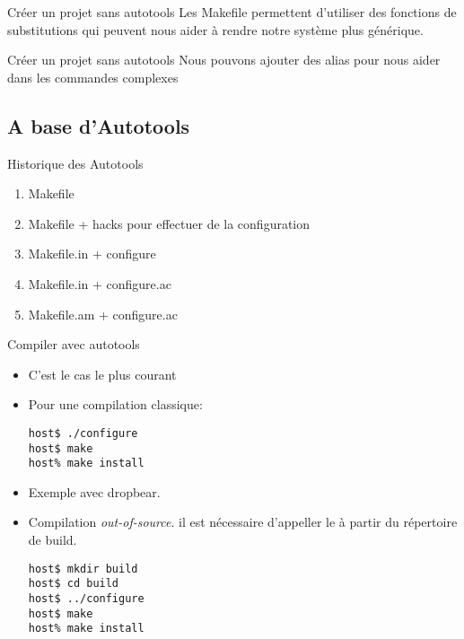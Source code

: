 \begin{frame}[fragile=singleslide]{Créer un projet sans autotools}
  Les  Makefile permettent d'utiliser  des fonctions  de substitutions
  qui  peuvent  nous aider  à  rendre  notre  système plus  générique.
  
\end{frame}

\begin{frame}[fragile=singleslide]{Créer un projet sans autotools}
  Nous pouvons  ajouter des alias  pour nous aider dans  les commandes
  complexes
  
\end{frame}

\subsection{A base d'Autotools}

\begin{frame}[fragile=singleslide]{Historique des Autotools}
  \begin{enumerate}
  \item Makefile
  \item Makefile + hacks pour effectuer de la configuration
  \item Makefile.in + configure
  \item Makefile.in + configure.ac
  \item Makefile.am + configure.ac
  \end{enumerate}
\end{frame}

\begin{frame}[fragile=singleslide]{Compiler avec autotools}
  \begin{itemize}
  \item C'est le cas le plus courant
  \item Pour une compilation classique:
\begin{lstlisting}
host$ ./configure
host$ make
host% make install
\end{lstlisting} %
  \item Exemple avec dropbear.
  \item Compilation \emph{out-of-source}. il est nécessaire d'appeller
    le  à partir du répertoire de build.
    \begin{lstlisting}
host$ mkdir build
host$ cd build
host$ ../configure
host$ make
host% make install
    \end{lstlisting} %
  \end{itemize}
\end{frame}

